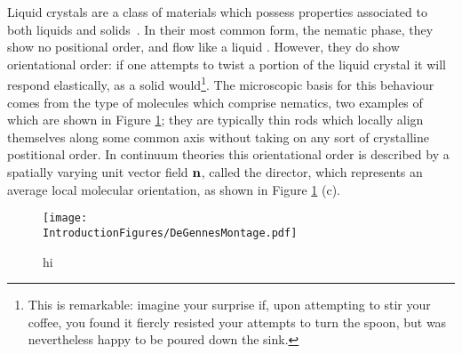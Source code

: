 Liquid crystals are a class of materials which possess properties associated to both liquids and solids~\cite{DeGennes}. In their most common form, the nematic phase, they show no positional order, and flow like a liquid . However, they do show orientational order: if one attempts to twist a portion of the liquid crystal it will respond elastically, as a solid would\footnote{This is remarkable: imagine your surprise if, upon attempting to stir your coffee, you found it fiercly resisted your attempts to turn the spoon, but was nevertheless happy to be poured down the sink.}. The microscopic basis for this behaviour comes from the type of molecules which comprise nematics, two examples of which are shown in Figure \ref{fig:DeGennesMontage}; they are typically thin rods which locally align themselves along some common axis without taking on any sort of crystalline postitional order. In continuum theories this orientational order is described by a spatially varying unit vector field $\bf n$, called the director, which represents an average local molecular orientation, as shown in Figure \ref{fig:DeGennesMontage} (c).
\begin{figure}[htbp]
\centering
\texttt{[image: \\IntroductionFigures/DeGennesMontage.pdf]}
\caption{hi }
\label{fig:DeGennesMontage}
\end{figure}

